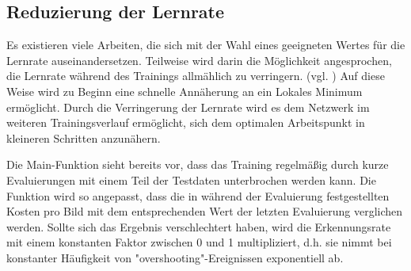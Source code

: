 \documentclass[../main.tex]{subfiles}
\begin{document}
\subsection{Reduzierung der Lernrate}
Es existieren viele Arbeiten, die sich mit der Wahl eines geeigneten Wertes für die Lernrate auseinandersetzen. Teilweise wird darin die Möglichkeit angesprochen, die Lernrate während des Trainings allmählich zu verringern. (vgl. \cite{sparseAutoencoder}) Auf diese Weise wird zu Beginn eine schnelle Annäherung an ein Lokales Minimum ermöglicht. Durch die Verringerung der Lernrate wird es dem Netzwerk im weiteren Trainingsverlauf ermöglicht, sich dem optimalen Arbeitspunkt in kleineren Schritten anzunähern. 

Die Main-Funktion sieht bereits vor, dass das Training regelmäßig durch kurze Evaluierungen mit einem Teil der Testdaten unterbrochen werden kann. Die Funktion wird so angepasst, dass die in während der Evaluierung festgestellten Kosten pro Bild mit dem entsprechenden Wert der letzten Evaluierung verglichen werden. Sollte sich das Ergebnis verschlechtert haben, wird die Erkennungsrate mit einem konstanten Faktor zwischen 0 und 1 multipliziert, d.h. sie nimmt bei konstanter Häufigkeit von "overshooting"-Ereignissen exponentiell ab. 
\end{document}
